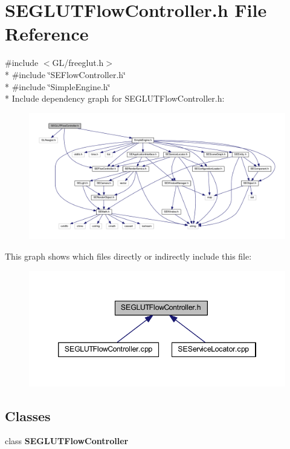 \section{S\+E\+G\+L\+U\+T\+Flow\+Controller.\+h File Reference}
\label{_s_e_g_l_u_t_flow_controller_8h}
{\ttfamily \#include $<$G\+L/freeglut.\+h$>$}\\*
{\ttfamily \#include \char`\"{}S\+E\+Flow\+Controller.\+h\char`\"{}}\\*
{\ttfamily \#include \char`\"{}Simple\+Engine.\+h\char`\"{}}\\*
Include dependency graph for S\+E\+G\+L\+U\+T\+Flow\+Controller.\+h\+:
\nopagebreak
\begin{figure}[H]
\begin{center}
\leavevmode
\includegraphics[width=350pt]{_s_e_g_l_u_t_flow_controller_8h__incl}
\end{center}
\end{figure}
This graph shows which files directly or indirectly include this file\+:
\nopagebreak
\begin{figure}[H]
\begin{center}
\leavevmode
\includegraphics[width=346pt]{_s_e_g_l_u_t_flow_controller_8h__dep__incl}
\end{center}
\end{figure}
\subsection*{Classes}
\begin{DoxyCompactItemize}
\item 
class {\bf S\+E\+G\+L\+U\+T\+Flow\+Controller}
\end{DoxyCompactItemize}
